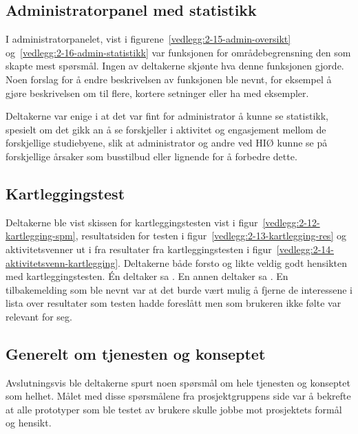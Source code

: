 \subsection{Administratorpanel med statistikk}

I administratorpanelet, vist i figurene~\ref{vedlegg:2-15-admin-oversikt} og~\ref{vedlegg:2-16-admin-statistikk} var funksjonen for områdebegrensning den som skapte mest spørsmål. Ingen av deltakerne skjønte hva denne funksjonen gjorde. Noen forslag for å endre beskrivelsen av funksjonen ble nevnt, for eksempel å gjøre beskrivelsen om til flere, kortere setninger eller ha med eksempler.

Deltakerne var enige i at det var fint for administrator å kunne se statistikk, spesielt om det gikk an å se forskjeller i aktivitet og engasjement mellom de forskjellige studiebyene, slik at administrator og andre ved HIØ kunne se på forskjellige årsaker som busstilbud eller lignende for å forbedre dette.


\subsection{Kartleggingstest}

Deltakerne ble vist skissen for kartleggingstesten vist i figur~\ref{vedlegg:2-12-kartlegging-spm}, resultatsiden for testen i figur~\ref{vedlegg:2-13-kartlegging-res} og aktivitetsvenner ut i fra resultater fra kartleggingstesten i figur~\ref{vedlegg:2-14-aktivitetsvenn-kartlegging}. Deltakerne både forsto og likte veldig godt hensikten med kartleggingstesten. Én deltaker sa . En annen deltaker sa . En tilbakemelding som ble nevnt var at det burde vært mulig å fjerne de interessene i lista over resultater som testen hadde foreslått men som brukeren ikke følte var relevant for seg.


\subsection{Generelt om tjenesten og konseptet}

Avslutningsvis ble deltakerne spurt noen spørsmål om hele tjenesten og konseptet som helhet. Målet med disse spørsmålene fra prosjektgruppens side var å bekrefte at alle prototyper som ble testet av brukere skulle jobbe mot prosjektets formål og hensikt.

